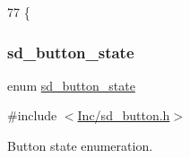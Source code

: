 \begin{DoxyCode}
77                    \{
\end{DoxyCode}
\mbox{\label{group___s_d___button___types_gad961a8af755b135c7e69a304d4f6303c}} 
\subsubsection{\texorpdfstring{sd\+\_\+button\+\_\+state}{sd\_button\_state}}
{\footnotesize\ttfamily enum \mbox{\hyperlink{group___s_d___button___types_gad961a8af755b135c7e69a304d4f6303c}{sd\+\_\+button\+\_\+state}}}



{\ttfamily \#include $<$\mbox{\hyperlink{sd__button_8h}{Inc/sd\+\_\+button.\+h}}$>$}



Button state enumeration. 

